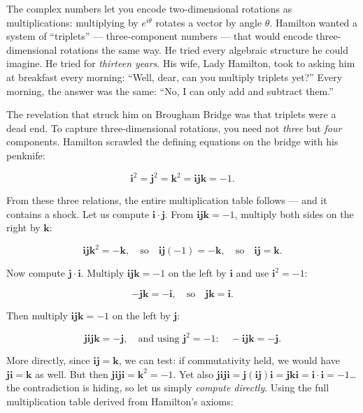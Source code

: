 The complex numbers let you encode two-dimensional rotations as multiplications: multiplying by \(e^{i\theta}\) rotates a vector by angle \(\theta\). Hamilton wanted a system of ``triplets'' --- three-component numbers --- that would encode three-dimensional rotations the same way. He tried every algebraic structure he could imagine. He tried for \emph{thirteen years}. His wife, Lady Hamilton, took to asking him at breakfast every morning: ``Well, dear, can you multiply triplets yet?'' Every morning, the answer was the same: ``No, I can only add and subtract them.''

The revelation that struck him on Brougham Bridge was that triplets were a dead end. To capture three-dimensional rotations, you need not \emph{three} but \emph{four} components. Hamilton scrawled the defining equations on the bridge with his penknife:

\[\mathbf{i}^2 = \mathbf{j}^2 = \mathbf{k}^2 = \mathbf{i}\mathbf{j}\mathbf{k} = -1.\]

From these three relations, the entire multiplication table follows --- and it contains a shock. Let us compute \(\mathbf{i} \cdot \mathbf{j}\). From \(\mathbf{i}\mathbf{j}\mathbf{k} = -1\), multiply both sides on the right by \(\mathbf{k}\):

\[\mathbf{i}\mathbf{j}\mathbf{k}^2 = -\mathbf{k}, \quad \text{so} \quad \mathbf{i}\mathbf{j}(-1) = -\mathbf{k}, \quad \text{so} \quad \mathbf{i}\mathbf{j} = \mathbf{k}.\]

Now compute \(\mathbf{j} \cdot \mathbf{i}\). Multiply \(\mathbf{i}\mathbf{j}\mathbf{k} = -1\) on the left by \(\mathbf{i}\) and use \(\mathbf{i}^2 = -1\):

\[-\mathbf{j}\mathbf{k} = -\mathbf{i}, \quad \text{so} \quad \mathbf{j}\mathbf{k} = \mathbf{i}.\]

Then multiply \(\mathbf{i}\mathbf{j}\mathbf{k} = -1\) on the left by \(\mathbf{j}\):

\[\mathbf{j}\mathbf{i}\mathbf{j}\mathbf{k} = -\mathbf{j}, \quad \text{and using } \mathbf{j}^2 = -1: \quad -\mathbf{i}\mathbf{j}\mathbf{k} = -\mathbf{j}.\]

More directly, since \(\mathbf{i}\mathbf{j} = \mathbf{k}\), we can test: if commutativity held, we would have \(\mathbf{j}\mathbf{i} = \mathbf{k}\) as well. But then \(\mathbf{j}\mathbf{i}\mathbf{j}\mathbf{i} = \mathbf{k}^2 = -1\). Yet also \(\mathbf{j}\mathbf{i}\mathbf{j}\mathbf{i} = \mathbf{j}(\mathbf{i}\mathbf{j})\mathbf{i} = \mathbf{j}\mathbf{k}\mathbf{i} = \mathbf{i} \cdot \mathbf{i} = -1\)\ldots{} the contradiction is hiding, so let us simply \emph{compute directly}. Using the full multiplication table derived from Hamilton's axioms:


